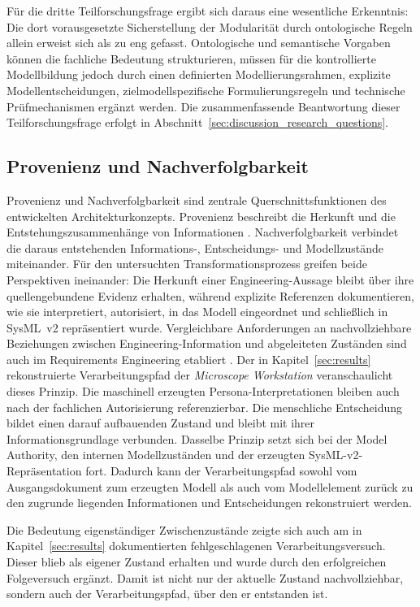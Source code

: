 Für die dritte Teilforschungsfrage ergibt sich daraus eine wesentliche
Erkenntnis: Die dort vorausgesetzte Sicherstellung der Modularität durch
ontologische Regeln allein erweist sich als zu eng gefasst. Ontologische und
semantische Vorgaben können die fachliche Bedeutung strukturieren, müssen
für die kontrollierte Modellbildung jedoch durch einen definierten
Modellierungsrahmen, explizite Modellentscheidungen,
zielmodellspezifische Formulierungsregeln und technische Prüfmechanismen
ergänzt werden. Die zusammenfassende Beantwortung dieser Teilforschungsfrage
erfolgt in Abschnitt~\ref{sec:discussion_research_questions}.

\subsection{Provenienz und Nachverfolgbarkeit}
\label{sec:discussion_traceability}

Provenienz und Nachverfolgbarkeit sind zentrale Querschnittsfunktionen des
entwickelten Architekturkonzepts. Provenienz beschreibt die Herkunft und die
Entstehungszusammenhänge von Informationen
\cite{MoreauMissier2013,Simmhan2005}. Nachverfolgbarkeit verbindet die
daraus entstehenden Informations-, Entscheidungs- und Modellzustände
miteinander. Für den untersuchten Transformationsprozess greifen beide
Perspektiven ineinander: Die Herkunft einer Engineering-Aussage bleibt über
ihre quellengebundene Evidenz erhalten, während explizite Referenzen
dokumentieren, wie sie interpretiert, autorisiert, in das Modell eingeordnet
und schließlich in SysML~v2 repräsentiert wurde. Vergleichbare Anforderungen
an nachvollziehbare Beziehungen zwischen Engineering-Information und
abgeleiteten Zuständen sind auch im Requirements Engineering etabliert
\cite{ISO29148}.
\newpage
Der in Kapitel~\ref{sec:results} rekonstruierte Verarbeitungspfad der
\emph{Microscope Workstation} veranschaulicht dieses Prinzip. Die
maschinell erzeugten Persona-Interpretationen bleiben auch nach der
fachlichen Autorisierung referenzierbar. Die menschliche Entscheidung bildet
einen darauf aufbauenden Zustand und bleibt mit ihrer Informationsgrundlage
verbunden. Dasselbe Prinzip setzt sich bei der Model Authority, den internen
Modellzuständen und der erzeugten SysML-v2-Repräsentation fort. Dadurch kann
der Verarbeitungspfad sowohl vom Ausgangsdokument zum erzeugten Modell als
auch vom Modellelement zurück zu den zugrunde liegenden Informationen und
Entscheidungen rekonstruiert werden.

Die Bedeutung eigenständiger Zwischenzustände zeigte sich auch am in
Kapitel~\ref{sec:results} dokumentierten fehlgeschlagenen
Verarbeitungsversuch. Dieser blieb als eigener Zustand erhalten und wurde
durch den erfolgreichen Folgeversuch ergänzt. Damit ist nicht nur der
aktuelle Zustand nachvollziehbar, sondern auch der Verarbeitungspfad, über
den er entstanden ist.

